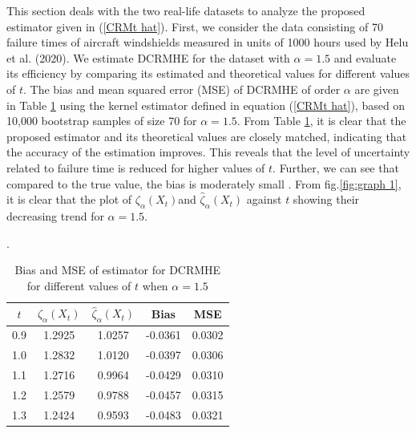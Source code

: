\documentclass[11pt,reqno]{amsart}
\theoremstyle{tight}
\begin{document}
This section deals with the two real-life datasets to analyze the proposed estimator given in (\ref{CRMt hat}). First, we consider the data consisting of  70 failure times of aircraft windshields measured in units of 1000 hours used by Helu et al. (2020).
    We estimate DCRMHE for the dataset with $\alpha=1.5$ and  evaluate its efficiency by comparing its estimated and theoretical values for different values of $t$. %
   The bias and mean squared error (MSE) of DCRMHE of order $\alpha$ are given in Table \ref{DCRMHEalpha=1.5} using the kernel estimator defined in equation (\ref{CRMt hat}), based on 10,000 bootstrap samples of size 70 for $\alpha=1.5$. From Table \ref{DCRMHEalpha=1.5}, it is clear that the proposed estimator and its theoretical values are closely matched, indicating that the accuracy of the estimation improves. This reveals that the level of uncertainty related to failure time is reduced for higher values of $t$. Further, we can see that compared to the true value, the bias is moderately small . From fig.\ref{fig:graph 1}, it is clear that the plot of $ \zeta_{\alpha}(X_t) $and $ \widehat{\zeta}_{\alpha}(X_t)$ against $t$ showing their decreasing trend for $\alpha=1.5$.



 \begin{table}[h!]
\centering
\caption{Bias and MSE of estimator for DCRMHE for different values of $t$ when $\alpha=1.5$}.
\label{DCRMHEalpha=1.5}
\begin{tabular}{c| c c c c}
\hline
$t$& \(\zeta_{\alpha}(X_t)\)& $ \widehat{\zeta}_{\alpha}(X_t)$& Bias & MSE \\
\hline
0.9 & 1.2925 & 1.0257&-0.0361&0.0302\\
1.0 & 1.2832&1.0120 &-0.0397& 0.0306\\

1.1 &  1.2716& 0.9964&-0.0429& 0.0310\\

1.2 &1.2579& 0.9788 &-0.0457 &0.0315\\

1.3 & 1.2424&0.9593 &-0.0483& 0.0321\\
\hline
\end{tabular}
\end{table}
\end{document}
